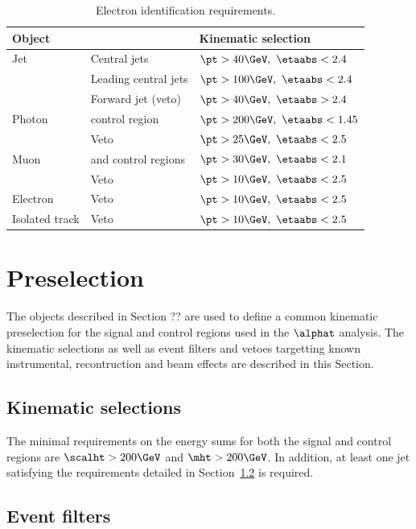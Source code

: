 \begin{table}[h!]
  \caption{Electron identification requirements.\label{tab:ele-id}}
  \centering
  \footnotesize
  \begin{tabular}{ lll }
    \hline
    \hline
    Object 	& 	&Kinematic selection \\
    \hline
    \hline
    Jet  		&Central jets& $\pt > 40 \GeV,\ \etaabs < 2.4$		    \\
			&Leading central jets&	$\pt > 100 \GeV,\ \etaabs < 2.4$	\\	    	    
			&Forward jet (veto) &$\pt > 40 \GeV,\ \etaabs > 2.4$	\\	    
    Photon  		&\gj control region& $\pt > 200 \GeV,\ \etaabs < 1.45$	\\	    
			&Veto& $\pt > 25 \GeV,\ \etaabs < 2.5$		    \\
    Muon  		&\mj and \mmj control regions& $\pt > 30 \GeV,\ \etaabs < 2.1$	\\	    
			&Veto& $\pt > 10 \GeV,\ \etaabs < 2.5$		    \\
    Electron  		&Veto& $\pt > 10 \GeV,\ \etaabs < 2.5$		    \\
    Isolated track  	&Veto& $\pt > 10 \GeV,\ \etaabs < 2.5$		    \\
		
    
    \hline
    \hline
  \end{tabular}
  \end{table}

\section{Preselection}
The objects described in Section ?? are used to define a common kinematic 
preselection for the signal and control regions used in the $\alphat$ analysis. 
The kinematic selections as well as event filters and vetoes targetting
known instrumental, recontruction and beam effects are described in this Section.

\subsection{Kinematic selections}
The minimal requirements on the energy sums for both the signal and control regions are
$\scalht > 200\GeV$ and $\mht > 200\GeV$. In addition, at least one jet satisfying the 
requirements detailed in Section~\ref{} is required.
\subsection{Event filters}
